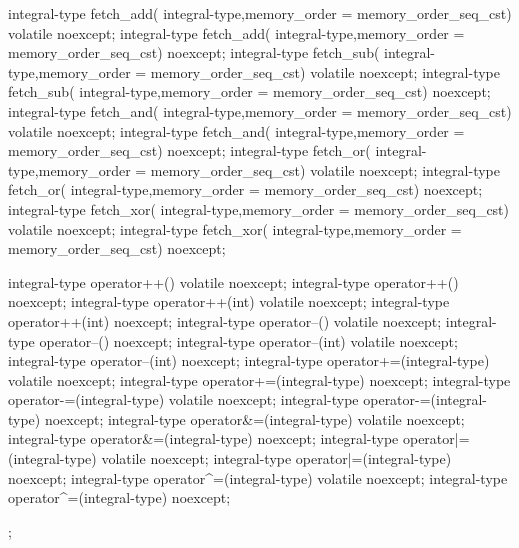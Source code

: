 \begin{cpp}
{  integral-type fetch_add(
      integral-type,memory_order = memory_order_seq_cst)
      volatile noexcept;
  integral-type fetch_add(
      integral-type,memory_order = memory_order_seq_cst) noexcept;
  integral-type fetch_sub(
      integral-type,memory_order = memory_order_seq_cst)
      volatile noexcept;
  integral-type fetch_sub(
      integral-type,memory_order = memory_order_seq_cst) noexcept;
  integral-type fetch_and(
      integral-type,memory_order = memory_order_seq_cst)
      volatile noexcept;
  integral-type fetch_and(
      integral-type,memory_order = memory_order_seq_cst) noexcept;
  integral-type fetch_or(
      integral-type,memory_order = memory_order_seq_cst)
      volatile noexcept;
  integral-type fetch_or(
      integral-type,memory_order = memory_order_seq_cst) noexcept;
  integral-type fetch_xor(
      integral-type,memory_order = memory_order_seq_cst)
      volatile noexcept;
  integral-type fetch_xor(
      integral-type,memory_order = memory_order_seq_cst) noexcept;

  integral-type operator++() volatile noexcept;
  integral-type operator++() noexcept;
  integral-type operator++(int) volatile noexcept;
  integral-type operator++(int) noexcept;
  integral-type operator--() volatile noexcept;
  integral-type operator--() noexcept;
  integral-type operator--(int) volatile noexcept;
  integral-type operator--(int) noexcept;
  integral-type operator+=(integral-type) volatile noexcept;
  integral-type operator+=(integral-type) noexcept;
  integral-type operator-=(integral-type) volatile noexcept;
  integral-type operator-=(integral-type) noexcept;
  integral-type operator&=(integral-type) volatile noexcept;
  integral-type operator&=(integral-type) noexcept;
  integral-type operator|=(integral-type) volatile noexcept;
  integral-type operator|=(integral-type) noexcept;
  integral-type operator^=(integral-type) volatile noexcept;
  integral-type operator^=(integral-type) noexcept;
};


\end{cpp}
